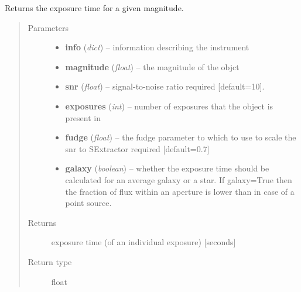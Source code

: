 \documentclass[a4paper,12pt,english]{sphinxmanual}
\begin{document}
\begin{fulllineitems}
\label{analysis:analysis.ETC.exposureTime}
Returns the exposure time for a given magnitude.
\begin{quote}\begin{description}
\item[{Parameters}] \leavevmode\begin{itemize}
\item {} 
\textbf{info} (\emph{dict}) -- information describing the instrument

\item {} 
\textbf{magnitude} (\emph{float}) -- the magnitude of the objct

\item {} 
\textbf{snr} (\emph{float}) -- signal-to-noise ratio required {[}default=10{]}.

\item {} 
\textbf{exposures} (\emph{int}) -- number of exposures that the object is present in

\item {} 
\textbf{fudge} (\emph{float}) -- the fudge parameter to which to use to scale the snr to SExtractor required {[}default=0.7{]}

\item {} 
\textbf{galaxy} (\emph{boolean}) -- whether the exposure time should be calculated for an average galaxy or a star.
If galaxy=True then the fraction of flux within an aperture is lower than in case of a point source.

\end{itemize}

\item[{Returns}] \leavevmode
exposure time (of an individual exposure) {[}seconds{]}

\item[{Return type}] \leavevmode
float

\end{description}\end{quote}

\end{fulllineitems}

\end{document}
